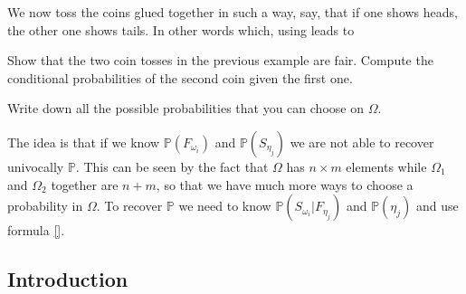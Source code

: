 \begin{example}
We now toss the coins glued together in such a way, say, that if one shows heads, the other one shows tails. In other words
 which, using 
leads to 
\end{example}
\begin{ExerciseList}

\Exercise Show that the two coin tosses in the previous example are fair. Compute the conditional probabilities of the second coin given the first one. 

\Exercise Write down all the possible probabilities that you can choose on $\Omega$.

\end{ExerciseList}

The idea is that if we know $\mathbb P(F_{\omega_i})$ and $\mathbb P(S_{\eta_j})$ we are not able to recover univocally $\mathbb P$.  This can be seen by the fact that $\Omega$ has $n\times m$ elements while $\Omega_1$ and $\Omega_2$ together are $n + m$, so that we have much more ways to choose a probability in $\Omega$. 
To recover $\mathbb P$ we need to know $\mathbb P(S_{\omega_i}|F_{\eta_j})$ and $\mathbb P(\eta_j)$
and use formula \eqref{}. 


\subsection{Introduction}

